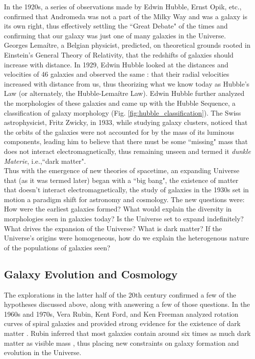 In the 1920s, a series of observations made by Edwin Hubble, Ernst Opik, etc., confirmed that Andromeda was not a part of the Milky Way and was a galaxy is its own right, thus effectively settling the ``Great Debate" of the times and confirming that our galaxy was just one of many galaxies in the Universe. Georges Lema{\'i}tre, a Belgian physicist, predicted, on theoretical grounds rooted in Einstein's General Theory of Relativity, that the redshifts of galaxies should increase with distance. In 1929, Edwin Hubble looked at the distances and velocities of 46 galaxies and observed the same \citep{1929PNAS...15..168H}: that their radial velocities increased with distance from us, thus theorizing what we know today as Hubble's Law (or alternately, the Hubble-Lema{\'i}tre Law). Edwin Hubble further analyzed the morphologies of these galaxies and came up with the Hubble Sequence, a classification of galaxy morphology (Fig. \ref{fig:hubble_classification}). The Swiss astrophysicist, Fritz Zwicky, in 1933, while studying galaxy clusters, noticed that the orbits of the galaxies were not accounted for by the mass of its luminous components, leading him to believe that there must be some ``missing" mass \citep{1937ApJ....86..217Z} that does not interact electromagnetically, thus remaining unseen and termed it \emph{dunkle Materie}, i.e.,``dark matter".\\

Thus with the emergence of new theories of spacetime, an expanding Universe that (as it was termed later) began with a ``big bang", the existence of matter that doesn't interact electromagnetically, the study of galaxies in the 1930s set in motion a paradigm shift for astronomy and cosmology. The new questions were: How were the earliest galaxies formed? What would explain the diversity in morphologies seen in galaxies today? Is the Universe set to expand indefinitely? What drives the expansion of the Universe? What is dark matter? If the Universe's origins were homogeneous, how do we explain the heterogenous nature of the populations of galaxies seen?\\

\subsection{Galaxy Evolution and Cosmology}

The explorations in the latter half of the 20th century confirmed a few of the hypotheses discussed above, along with answering a few of those questions. In the 1960s and 1970s, Vera Rubin, Kent Ford, and Ken Freeman analyzed rotation curves of spiral galaxies and provided strong evidence for the existence of dark matter \citep{freeman_disks_1970-1}. Rubin inferred that most galaxies contain around six times as much dark matter as visible mass \citep{rubin_rotational_1980}, thus placing new constraints on galaxy formation and evolution in the Universe.\\

